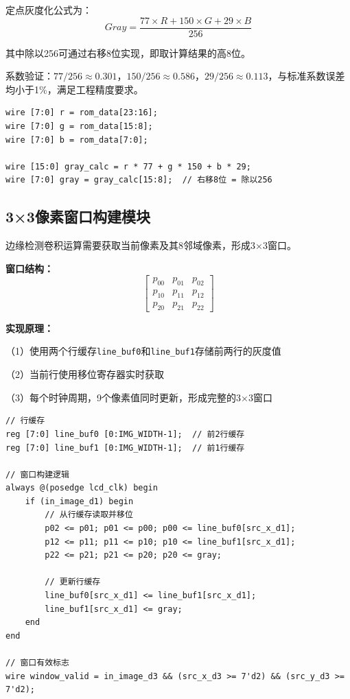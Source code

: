 \documentclass[12pt,hyperref,a4paper,UTF8]{ctexart}
\begin{document}
定点灰度化公式为：
\begin{equation}
Gray = \frac{77 \times R + 150 \times G + 29 \times B}{256}
\end{equation}

其中除以256可通过右移8位实现，即取计算结果的高8位。

系数验证：$77/256 \approx 0.301$，$150/256 \approx 0.586$，$29/256 \approx 0.113$，与标准系数误差均小于1\%，满足工程精度要求。

\begin{lstlisting}[caption={RGB转灰度模块代码}]
wire [7:0] r = rom_data[23:16];
wire [7:0] g = rom_data[15:8];
wire [7:0] b = rom_data[7:0];

wire [15:0] gray_calc = r * 77 + g * 150 + b * 29;
wire [7:0] gray = gray_calc[15:8];  // 右移8位 = 除以256
\end{lstlisting}

\subsection{3×3像素窗口构建模块}

边缘检测卷积运算需要获取当前像素及其8邻域像素，形成3×3窗口。

\textbf{窗口结构：}
\begin{equation}
\begin{bmatrix} p_{00} & p_{01} & p_{02} \\ p_{10} & p_{11} & p_{12} \\ p_{20} & p_{21} & p_{22} \end{bmatrix}
\end{equation}

\textbf{实现原理：}

（1）使用两个行缓存\texttt{line\_buf0}和\texttt{line\_buf1}存储前两行的灰度值

（2）当前行使用移位寄存器实时获取

（3）每个时钟周期，9个像素值同时更新，形成完整的3×3窗口

\begin{lstlisting}[caption={3×3窗口构建代码}]
// 行缓存
reg [7:0] line_buf0 [0:IMG_WIDTH-1];  // 前2行缓存
reg [7:0] line_buf1 [0:IMG_WIDTH-1];  // 前1行缓存

// 窗口构建逻辑
always @(posedge lcd_clk) begin
    if (in_image_d1) begin
        // 从行缓存读取并移位
        p02 <= p01; p01 <= p00; p00 <= line_buf0[src_x_d1];
        p12 <= p11; p11 <= p10; p10 <= line_buf1[src_x_d1];
        p22 <= p21; p21 <= p20; p20 <= gray;
        
        // 更新行缓存
        line_buf0[src_x_d1] <= line_buf1[src_x_d1];
        line_buf1[src_x_d1] <= gray;
    end
end

// 窗口有效标志
wire window_valid = in_image_d3 && (src_x_d3 >= 7'd2) && (src_y_d3 >= 7'd2);
\end{lstlisting}
\end{document}
